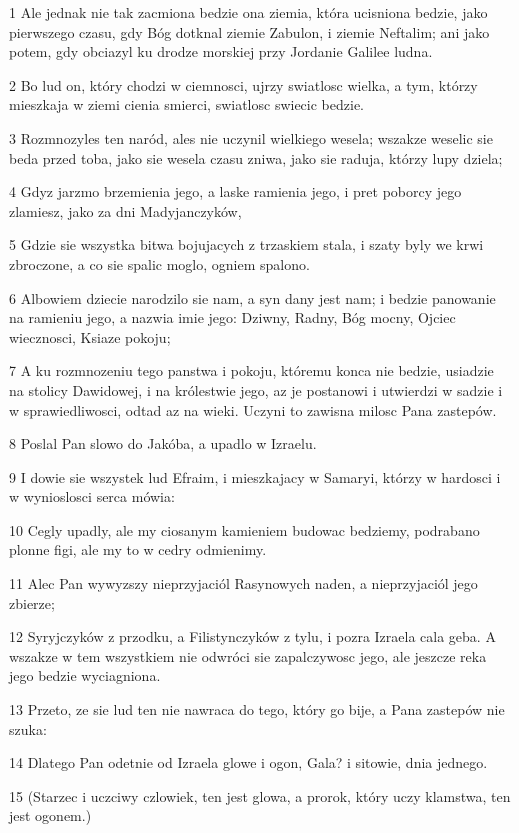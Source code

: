 \par 1 Ale jednak nie tak zacmiona bedzie ona ziemia, która ucisniona bedzie, jako pierwszego czasu, gdy Bóg dotknal ziemie Zabulon, i ziemie Neftalim; ani jako potem, gdy obciazyl ku drodze morskiej przy Jordanie Galilee ludna.
\par 2 Bo lud on, który chodzi w ciemnosci, ujrzy swiatlosc wielka, a tym, którzy mieszkaja w ziemi cienia smierci, swiatlosc swiecic bedzie.
\par 3 Rozmnozyles ten naród, ales nie uczynil wielkiego wesela; wszakze weselic sie beda przed toba, jako sie wesela czasu zniwa, jako sie raduja, którzy lupy dziela;
\par 4 Gdyz jarzmo brzemienia jego, a laske ramienia jego, i pret poborcy jego zlamiesz, jako za dni Madyjanczyków,
\par 5 Gdzie sie wszystka bitwa bojujacych z trzaskiem stala, i szaty byly we krwi zbroczone, a co sie spalic moglo, ogniem spalono.
\par 6 Albowiem dziecie narodzilo sie nam, a syn dany jest nam; i bedzie panowanie na ramieniu jego, a nazwia imie jego: Dziwny, Radny, Bóg mocny, Ojciec wiecznosci, Ksiaze pokoju;
\par 7 A ku rozmnozeniu tego panstwa i pokoju, któremu konca nie bedzie, usiadzie na stolicy Dawidowej, i na królestwie jego, az je postanowi i utwierdzi w sadzie i w sprawiedliwosci, odtad az na wieki. Uczyni to zawisna milosc Pana zastepów.
\par 8 Poslal Pan slowo do Jakóba, a upadlo w Izraelu.
\par 9 I dowie sie wszystek lud Efraim, i mieszkajacy w Samaryi, którzy w hardosci i w wynioslosci serca mówia:
\par 10 Cegly upadly, ale my ciosanym kamieniem budowac bedziemy, podrabano plonne figi, ale my to w cedry odmienimy.
\par 11 Alec Pan wywyzszy nieprzyjaciól Rasynowych naden, a nieprzyjaciól jego zbierze;
\par 12 Syryjczyków z przodku, a Filistynczyków z tylu, i pozra Izraela cala geba. A wszakze w tem wszystkiem nie odwróci sie zapalczywosc jego, ale jeszcze reka jego bedzie wyciagniona.
\par 13 Przeto, ze sie lud ten nie nawraca do tego, który go bije, a Pana zastepów nie szuka:
\par 14 Dlatego Pan odetnie od Izraela glowe i ogon, Gala? i sitowie, dnia jednego.
\par 15 (Starzec i uczciwy czlowiek, ten jest glowa, a prorok, który uczy klamstwa, ten jest ogonem.)
